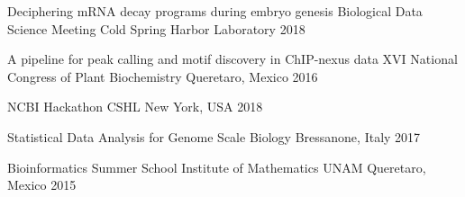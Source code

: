 


\begin{cvhonors}

  \cvhonor
    {Deciphering mRNA decay programs during embryo genesis} %
    {Biological Data Science Meeting} %
    {Cold Spring Harbor Laboratory} %
    {2018} %

  \cvhonor
    {A pipeline for peak calling and motif discovery in ChIP-nexus data} %
    {XVI National Congress of Plant Biochemistry} %
    {Queretaro, Mexico} %
    {2016} %
    

\end{cvhonors}


\begin{cvhonors}


  \cvhonor
    {NCBI Hackathon} %
    {CSHL} %
    {New York, USA} %
    {2018} %


  \cvhonor
    {Statistical Data Analysis for Genome Scale Biology} %
    {} %
    {Bressanone, Italy} %
    {2017} %

  \cvhonor
    {Bioinformatics Summer School} %
    {Institute of Mathematics UNAM} %
    {Queretaro, Mexico} %
    {2015} %
    

\end{cvhonors}
